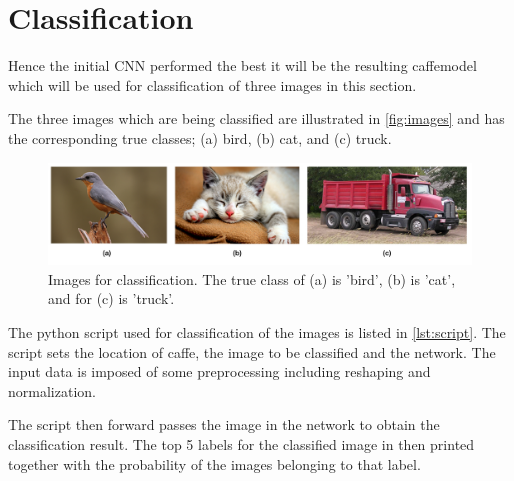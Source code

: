 \graphicspath{{Chapters/Project/}}

\section{Classification} %
\label{sec:classification}

Hence the initial CNN performed the best it will be the resulting caffemodel
which will be used for classification of three images in this section.

The three images which are being classified are illustrated in \autoref{fig:images} and has the corresponding true classes; (a) bird, (b) cat, and (c) truck.

\begin{figure}[H]
  \centering
  \includegraphics[width=\columnwidth]{Img/classification-images.pdf}
  \caption{Images for classification. The true class of (a) is 'bird', (b) is 'cat', and for (c) is 'truck'. }
  \label{fig:images}
\end{figure}

The python script used for classification of the images is listed in \autoref{lst:script}. The script sets the location of caffe, the image to be classified and the network. The input data is imposed of some preprocessing including reshaping and normalization.

The script then forward passes the image in the network to obtain the classification result. The top 5 labels for the classified image in then printed together with the probability of the images belonging to that label.

